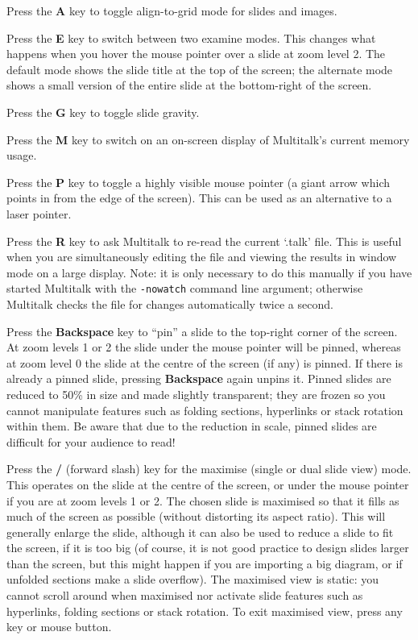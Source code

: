 \documentclass[12pt,a4paper,twoside]{article}
\renewcommand{\_}{\texttt{\symbol{95}}}
\begin{document}
Press the \textbf{A} key to toggle align-to-grid mode for slides and images.

Press the \textbf{E} key to switch between two examine modes.
This changes what happens when you hover the mouse pointer over a slide
at zoom level 2. The default mode shows the slide title at the
top of the screen; the alternate mode shows a small version of
the entire slide at the bottom-right of the screen.

Press the \textbf{G} key to toggle slide gravity.

Press the \textbf{M} key to switch on an on-screen display of Multitalk's
current memory usage.

Press the \textbf{P} key to toggle a highly visible mouse pointer
(a giant arrow which points in from the edge of the screen).
This can be used as an alternative to a laser pointer.

Press the \textbf{R} key to ask Multitalk to re-read the current `.talk' file.
This is useful when you are simultaneously editing the file and
viewing the results in window mode on a large display.
Note: it is only necessary to do this manually if you have started
Multitalk with the \verb^-nowatch^ command line argument; otherwise
Multitalk checks the file for changes automatically twice a second.

Press the \textbf{Backspace} key to ``pin'' a slide to the top-right corner of
the screen. At zoom levels 1 or 2 the
slide under the mouse pointer will be pinned, whereas at zoom level 0
the slide at the centre of the screen (if any) is pinned. If there
is already a pinned slide, pressing \textbf{Backspace} again unpins it.
Pinned slides are reduced to 50\% in size and made slightly transparent;
they are frozen so you cannot manipulate features such as folding
sections, hyperlinks or stack rotation within them.
Be aware that due to the reduction in scale, pinned slides are
difficult for your audience to read!

Press the \textbf{/} (forward slash) key for the maximise (single
or dual slide view) mode. This operates on the slide at the
centre of the screen, or under the mouse pointer if you are at
zoom levels 1 or 2.
The chosen slide is maximised so that
it fills as much of the screen as possible (without distorting
its aspect ratio). This will generally enlarge the slide, although
it can also be used to reduce a slide to fit the screen, if it is too
big (of course, it is not good practice to design slides larger
than the screen, but this might happen if you are importing a big
diagram, or if unfolded sections make a slide overflow).
The maximised view is static: you cannot scroll around when maximised
nor activate slide features such as hyperlinks, folding sections
or stack rotation.
To exit maximised view, press any key or mouse button.
\end{document}
